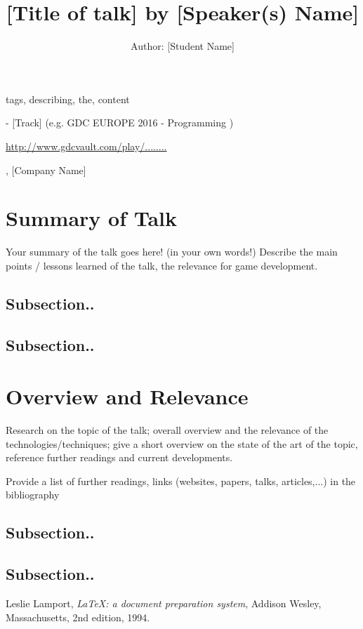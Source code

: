 \documentclass[a4paper]{article}
\title{[Title of talk] by [Speaker(s) Name]}
\author{Author: [Student Name]}
\begin{document}
\maketitle

\begin{keywords} tags, describing, the, content \end{keywords}

\begin{track} [Event] - [Track] (e.g. GDC EUROPE 2016 - Programming ) \end{track}

\begin{talkurl}  \url{http://www.gdcvault.com/play/........} \end{talkurl}

\begin{speaker}, [Company Name] \end{speaker}


\begin{abstract}


\end{abstract}

\section{Summary of Talk}

Your summary of the talk goes here! (in your own words!) 
Describe the main points / lessons learned of the talk, the relevance for game development. 

\subsection{Subsection..}
\subsection{Subsection..}

\section{Overview and Relevance}
Research on the topic of the talk; overall overview and the relevance of the technologies/techniques; give a short overview on the state of the art of the topic, reference further readings and current developments. 

Provide a list of further readings, links (websites, papers, talks, articles,...) in the bibliography  

\subsection{Subsection..}
\subsection{Subsection..}

\renewcommand{\refname}{\section{References and Further Sources}}
\begin{thebibliography}{1}

  Leslie Lamport,
  \emph{\LaTeX: a document preparation system},
  Addison Wesley, Massachusetts,
  2nd edition,
  1994.

\end{thebibliography}
\end{document}
